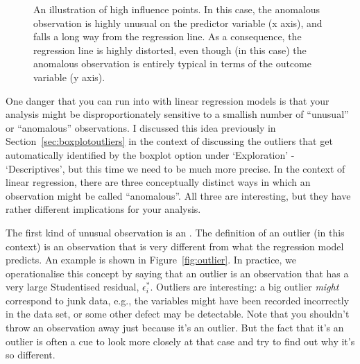 \begin{figure}[!b]
\begin{center}
\caption{An illustration of high influence points. In this case, the anomalous observation is highly unusual on the predictor variable (x axis), and falls a long way from the regression line. As a consequence, the regression line is highly distorted, even though (in this case) the anomalous observation is entirely typical in terms of the outcome variable (y axis).}
\HR
\label{fig:influence}
\end{center}
\end{figure}

One danger that you can run into with linear regression models is that your analysis might be disproportionately sensitive to a smallish number of ``unusual'' or ``anomalous'' observations. I discussed this idea previously in Section~\ref{sec:boxplotoutliers} in the context of discussing the outliers that get automatically identified by the boxplot option under `Exploration' - `Descriptives', but this time we need to be much more precise. In the context of linear regression, there are three conceptually distinct ways in which an observation might be called ``anomalous''. All three are interesting, but they have rather different implications for your analysis.

The first kind of unusual observation is an . The definition of an outlier (in this context) is an observation that is very different from what the regression model predicts. An example is shown in Figure~\ref{fig:outlier}. In practice, we operationalise this concept by saying that an outlier is an observation that has a very large Studentised residual, $\epsilon_i^*$. Outliers are interesting: a big outlier {\it might} correspond to junk data, e.g., the variables might have been recorded incorrectly in the data set, or some other defect may be detectable. Note that you shouldn't throw an observation away just because it's an outlier. But the fact that it's an outlier is often a cue to look more closely at that case and try to find out why it's so different.

